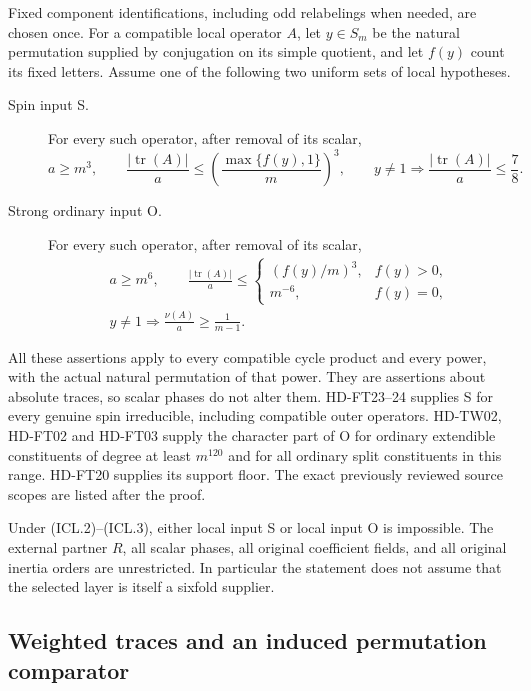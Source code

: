 Fixed component identifications, including odd relabelings when
needed, are chosen once.  For a compatible local operator $A$,
let $y\in S_m$ be the natural permutation supplied by conjugation
on its simple quotient, and let $f(y)$ count its fixed letters.
Assume one of the following two uniform sets of local hypotheses.
\begin{description}
\item[Spin input S.]
For every such operator, after removal of its scalar,
\[
 a\ge m^3,\qquad
 \frac{|\operatorname{tr}(A)|}{a}
       \le\left(\frac{\max\{f(y),1\}}m\right)^3,
 \qquad y\ne1\Longrightarrow
       \frac{|\operatorname{tr}(A)|}{a}\le\frac78.
 \tag{ICL.4}
\]
\item[Strong ordinary input O.]
For every such operator, after removal of its scalar,
\[
 \begin{gathered}
 a\ge m^6,\qquad
 \frac{|\operatorname{tr}(A)|}{a}
 \le\begin{cases}(f(y)/m)^3,&f(y)>0,\\m^{-6},&f(y)=0,
       \end{cases}\\
 y\ne1\Longrightarrow \frac{\nu(A)}a\ge\frac1{m-1}.
 \end{gathered}
 \tag{ICL.5}
\]
\end{description}
All these assertions apply to every compatible cycle product and
every power, with the actual natural permutation of that power.
They are assertions about absolute traces, so scalar phases do not
alter them.  HD-FT23--24 supplies S for every genuine spin
irreducible, including compatible outer operators.  HD-TW02,
HD-FT02 and HD-FT03 supply the character part of O for ordinary
extendible constituents of degree at least $m^{120}$ and for all
ordinary split constituents in this range.  HD-FT20 supplies its
support floor.  The exact previously reviewed source scopes are
listed after the proof.

\begin{theorem}[D-TD49]
Under (ICL.2)--(ICL.3), either local input S or local input O
is impossible.  The external partner $R$, all scalar phases,
all original coefficient fields, and all original inertia orders
are unrestricted.  In particular the statement does not assume
that the selected layer is itself a sixfold supplier.
\end{theorem}

\subsection*{Weighted traces and an induced permutation comparator}

